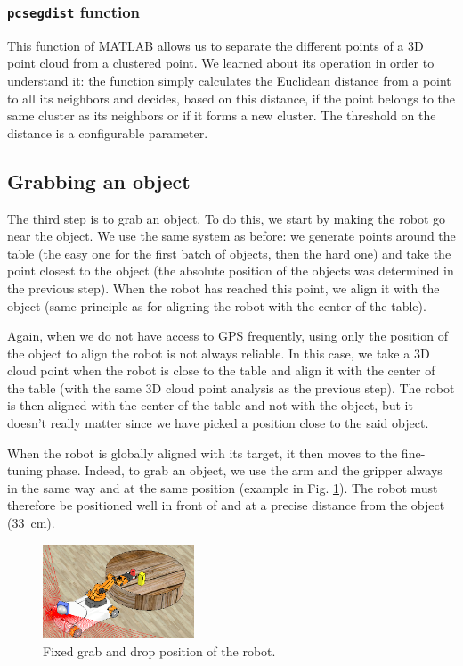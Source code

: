 \documentclass[a4paper, 10pt, conference]{ieeeconf}
\begin{document}
    \subsubsection{\texttt{pcsegdist} function}
    
    This function of MATLAB allows us to separate the different points of a 3D point cloud from a clustered point. We learned about its operation in order to understand it: the function simply calculates the Euclidean distance from a point to all its neighbors and decides, based on this distance, if the point belongs to the same cluster as its neighbors or if it forms a new cluster. The threshold on the distance is a configurable parameter.
    
    \subsection{Grabbing an object}
    
    The third step is to grab an object. To do this, we start by making the robot go near the object. We use the same system as before: we generate points around the table (the easy one for the first batch of objects, then the hard one) and take the point closest to the object (the absolute position of the objects was determined in the previous step). When the robot has reached this point, we align it with the object (same principle as for aligning the robot with the center of the table).
    
    Again, when we do not have access to GPS frequently, using only the position of the object to align the robot is not always reliable. In this case, we take a 3D cloud point when the robot is close to the table and align it with the center of the table (with the same 3D cloud point analysis as the previous step). The robot is then aligned with the center of the table and not with the object, but it doesn't really matter since we have picked a position close to the said object.
    
    When the robot is globally aligned with its target, it then moves to the fine-tuning phase. Indeed, to grab an object, we use the arm and the gripper always in the same way and at the same position (example in Fig. \ref{fig:manipulation.grasp.drop.position}). The robot must therefore be positioned well in front of and at a precise distance from the object (\SI{33}{\centi\meter}).
    
    \begin{figure}[!h]
        \centering
        \includegraphics[width=0.4\textwidth]{resources/png/grasp-drop-position.png}
        \caption{Fixed grab and drop position of the robot.}
        \label{fig:manipulation.grasp.drop.position}
    \end{figure}
    
\end{document}
